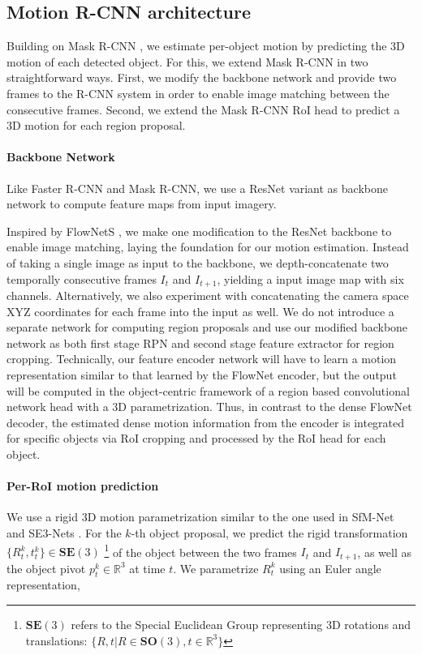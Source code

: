 
\subsection{Motion R-CNN architecture}

Building on Mask R-CNN \cite{MaskRCNN},
we estimate per-object motion by predicting the 3D motion of each detected object.
For this, we extend Mask R-CNN in two straightforward ways.
First, we modify the backbone network and provide two frames to the R-CNN system
in order to enable image matching between the consecutive frames.
Second, we extend the Mask R-CNN RoI head to predict a 3D motion for each
region proposal.

\paragraph{Backbone Network}
Like Faster R-CNN and Mask R-CNN, we use a ResNet \cite{ResNet} variant as backbone network to compute feature maps from input imagery.

Inspired by FlowNetS \cite{FlowNet}, we make one modification to the ResNet backbone to enable image matching,
laying the foundation for our motion estimation. Instead of taking a single image as input to the backbone,
we depth-concatenate two temporally consecutive frames $I_t$ and $I_{t+1}$, yielding a input image map with six channels.
Alternatively, we also experiment with concatenating the camera space XYZ coordinates for each frame
into the input as well.
We do not introduce a separate network for computing region proposals and use our modified backbone network
as both first stage RPN and second stage feature extractor for region cropping.
Technically, our feature encoder network will have to learn a motion representation similar to
that learned by the FlowNet encoder, but the output will be computed in the
object-centric framework of a region based convolutional network head with a 3D parametrization.
Thus, in contrast to the dense FlowNet decoder, the estimated dense motion information
from the encoder is integrated for specific objects via RoI cropping and
processed by the RoI head for each object.

\paragraph{Per-RoI motion prediction}
We use a rigid 3D motion parametrization similar to the one used in SfM-Net and SE3-Nets \cite{SfmNet,SE3Nets}.
For the $k$-th object proposal, we predict the rigid transformation $\{R_t^k, t_t^k\}\in \mathbf{SE}(3)$
\footnote{$\mathbf{SE}(3)$ refers to the Special Euclidean Group representing 3D rotations
and translations: $\{R, t|R \in \mathbf{SO}(3), t \in \mathbb{R}^3\}$}
of the object between the two frames $I_t$ and $I_{t+1}$, as well as the object pivot $p_t^k \in \mathbb{R}^3$ at time $t$.
We parametrize ${R_t^k}$ using an Euler angle representation,

